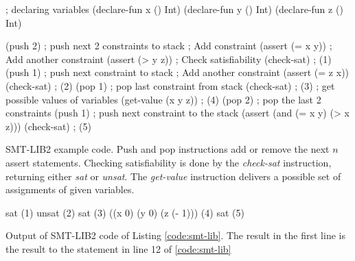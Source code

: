 \begin{program}[h!]
	\begin{LispCode}
; declaring variables
(declare-fun x () Int)
(declare-fun y () Int)
(declare-fun z () Int)
		
(push 2) ; push next 2 constraints to stack
; Add constraint
(assert (= x y))
; Add another constraint
(assert (> y z))
; Check satisfiability
(check-sat) ; (1)
(push 1) ; push next constraint to stack
; Add another constraint
(assert (= z x))
(check-sat) ; (2)
(pop 1) ; pop last constraint from stack
(check-sat) ; (3)
; get possible values of variables
(get-value (x y z)) ; (4)
(pop 2) ; pop the last 2 constraints
(push 1) ; push next constraint to the stack
(assert (and (= x y) (> x z)))
(check-sat) ; (5)\end{LispCode}
	\caption{SMT-LIB2 example code. Push and pop instructions add or remove the next $n$ assert statements. Checking satisfiability is done by the \emph{check-sat} instruction, returning either \emph{sat} or \emph{unsat}. The \emph{get-value} instruction delivers a possible set of assignments of given variables. }
	\label{code:smt-lib}
\end{program}

\begin{program}[h!]
	\begin{GenericCode}
sat (1)
unsat
(2)
sat
(3)
((x 0)
(y 0)
(z (- 1)))
(4)
sat (5)
\end{GenericCode}
	\caption{Output of SMT-LIB2 code of Listing \ref{code:smt-lib}. The result in the first line is the result to the statement in line 12 of \ref{code:smt-lib}}
	\label{code:smt-lib out}
\end{program}




